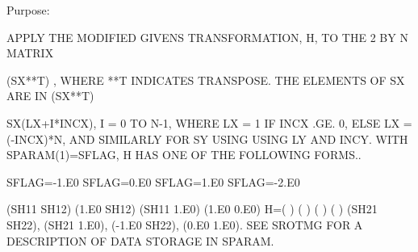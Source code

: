 \begin{DoxyParagraph}{Purpose\+: }
\begin{DoxyVerb}    APPLY THE MODIFIED GIVENS TRANSFORMATION, H, TO THE 2 BY N MATRIX

    (SX**T) , WHERE **T INDICATES TRANSPOSE. THE ELEMENTS OF SX ARE IN
    (SX**T)

    SX(LX+I*INCX), I = 0 TO N-1, WHERE LX = 1 IF INCX .GE. 0, ELSE
    LX = (-INCX)*N, AND SIMILARLY FOR SY USING USING LY AND INCY.
    WITH SPARAM(1)=SFLAG, H HAS ONE OF THE FOLLOWING FORMS..

    SFLAG=-1.E0     SFLAG=0.E0        SFLAG=1.E0     SFLAG=-2.E0

      (SH11  SH12)    (1.E0  SH12)    (SH11  1.E0)    (1.E0  0.E0)
    H=(          )    (          )    (          )    (          )
      (SH21  SH22),   (SH21  1.E0),   (-1.E0 SH22),   (0.E0  1.E0).
    SEE  SROTMG FOR A DESCRIPTION OF DATA STORAGE IN SPARAM.\end{DoxyVerb}
 
\end{DoxyParagraph}

